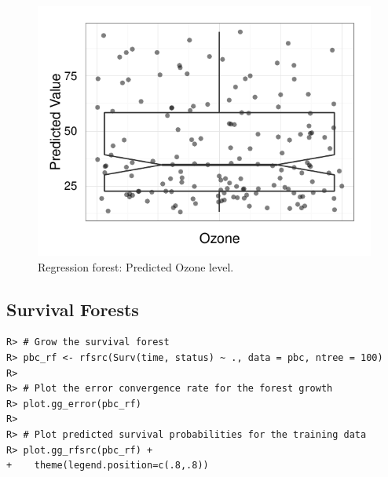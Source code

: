 \documentclass[nojss]{jss}\usepackage[]{graphicx}\usepackage[]{color}
\makeatletter
\def\maxwidth{ %
  \ifdim\Gin@nat@width>\linewidth
    \linewidth
  \else
    \Gin@nat@width
  \fi
}
\newenvironment{kframe}{%
 \def\at@end@of@kframe{}%
 \ifinner\ifhmode%
  \def\at@end@of@kframe{\end{minipage}}%
  \begin{minipage}{\columnwidth}%
 \fi\fi%
 \def\FrameCommand##1{\hskip\@totalleftmargin \hskip-\fboxsep
 \colorbox{shadecolor}{##1}\hskip-\fboxsep
     \hskip-\linewidth \hskip-\@totalleftmargin \hskip\columnwidth}%
 \MakeFramed {\advance\hsize-\width
   \@totalleftmargin\z@ \linewidth\hsize
   \@setminipage}}%
 {\par\unskip\endMakeFramed%
 \at@end@of@kframe}
\newenvironment{knitrout}{}{} %
\makeatother
\begin{document}
\begin{knitrout}\footnotesize
{}\color{fgcolor}\begin{figure}[!htpb]


{\centering \includegraphics[width=\maxwidth]{figure/beamer-airq-rf-plot-1} 

}

\caption[Regression forest]{Regression forest: Predicted Ozone level.\label{fig:airq-rf-plot}}
\end{figure}


\end{knitrout}


\subsection{Survival Forests}
\begin{knitrout}\footnotesize
{}\color{fgcolor}\begin{kframe}
\begin{verbatim}
R> # Grow the survival forest
R> pbc_rf <- rfsrc(Surv(time, status) ~ ., data = pbc, ntree = 100)
R> 
R> # Plot the error convergence rate for the forest growth
R> plot.gg_error(pbc_rf)
R> 
R> # Plot predicted survival probabilities for the training data
R> plot.gg_rfsrc(pbc_rf) +
+    theme(legend.position=c(.8,.8))
\end{verbatim}
\end{kframe}
\end{knitrout}
\end{document}
